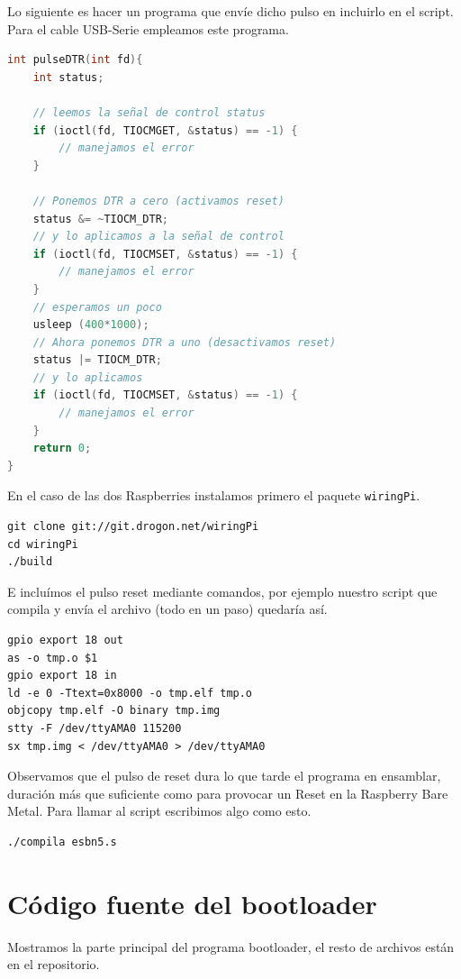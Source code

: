 Lo siguiente es hacer un programa que envíe dicho pulso en incluirlo en el script. Para
el cable USB-Serie empleamos este programa.

\begin{lstlisting}[language=C]
int pulseDTR(int fd){
    int status;

    // leemos la señal de control status
    if (ioctl(fd, TIOCMGET, &status) == -1) {
        // manejamos el error
    }

    // Ponemos DTR a cero (activamos reset)
    status &= ~TIOCM_DTR;
    // y lo aplicamos a la señal de control
    if (ioctl(fd, TIOCMSET, &status) == -1) {
        // manejamos el error
    }
    // esperamos un poco
    usleep (400*1000);
    // Ahora ponemos DTR a uno (desactivamos reset)
    status |= TIOCM_DTR;
    // y lo aplicamos
    if (ioctl(fd, TIOCMSET, &status) == -1) {
        // manejamos el error
    }
    return 0;
}
\end{lstlisting}

En el caso de las dos Raspberries instalamos primero el paquete {\tt wiringPi}.

\begin{lstlisting}
git clone git://git.drogon.net/wiringPi
cd wiringPi
./build
\end{lstlisting}

E incluímos el pulso reset mediante comandos, por ejemplo nuestro script que compila
y envía el archivo (todo en un paso) quedaría así.

\begin{lstlisting}
gpio export 18 out
as -o tmp.o $1
gpio export 18 in
ld -e 0 -Ttext=0x8000 -o tmp.elf tmp.o
objcopy tmp.elf -O binary tmp.img
stty -F /dev/ttyAMA0 115200
sx tmp.img < /dev/ttyAMA0 > /dev/ttyAMA0
\end{lstlisting}

Observamos que el pulso de reset dura lo que tarde el programa en ensamblar, duración
más que suficiente como para provocar un Reset en la Raspberry Bare Metal. Para llamar
al script escribimos algo como esto.

\begin{lstlisting}
./compila esbn5.s
\end{lstlisting}

\section{Código fuente del bootloader}

Mostramos la parte principal del programa bootloader, el resto de archivos están
en el repositorio.


